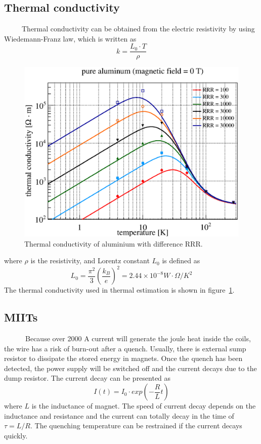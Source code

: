 \subsection{Thermal conductivity}
~~~~~Thermal conductivity can be obtained from the electric resistivity by using Wiedemann-Franz law, which is written as
\begin{equation}
 k = \frac{L_0 \cdot T}{\rho}
\end{equation}
\begin{figure}[H]
 \centering
 \includegraphics[scale=0.43]{chapter5/fig/thermalcon.eps}
 \caption{Thermal conductivity of aluminium with difference RRR.}
 \label{therm}
\end{figure}
where $\rho$ is the resistivity, and Lorentz constant $L_0$ is defined as
\begin{equation}
 L_0 = \frac{\pi^2}{3}(\frac{k_B}{e})^2 = 2.44\times 10^{-8} W\cdot\Omega /K^2
\end{equation}
The thermal conductivity used in thermal estimation is shown in figure~\ref{therm}.

  \subsection{MIITs}
~~~~~~Because over 2000 A current will generate the joule heat inside the coils, the wire has a risk of burn-out after a quench.
Usually, there is external sump resistor to dissipate the stored energy in magnets.
Once the quench has been detected, the power supply will be switched off and the current decays due to the dump resistor.
The current decay can be presented as
\begin{equation}
 I(t) = I_0 \cdot exp(-\frac{R}{L} t)
\label{curde}
\end{equation}
where $L$ is the inductance of magnet.
The speed of current decay depends on the inductance and resistance and the current can totally decay in the time of $\tau = L/R$.
The quenching temperature can be restrained if the current decays quickly.

